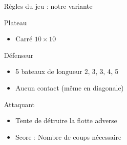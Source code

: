	\begin{frame}{Règles du jeu : notre variante}
	    \begin{block}{Plateau}
	        \begin{itemize}
	            \item Carré $10 \times 10$
	        \end{itemize}{}
	    \end{block}
	    \begin{block}{Défenseur}
	        \begin{itemize}
	            \item 5 bateaux de longueur 2, 3, 3, 4, 5
	            \item Aucun contact (même en diagonale)
	        \end{itemize}{}
	    \end{block}
	    \begin{block}{Attaquant}
	        \begin{itemize}
	            \item Tente de détruire la flotte adverse
	            \item Score : Nombre de coups nécessaire
	        \end{itemize}{}
	    \end{block}
	\end{frame}{}
	
